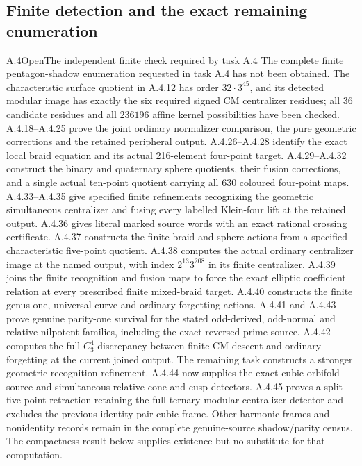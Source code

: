 \subsection{Finite detection and the exact remaining enumeration}

\begin{result}{A.4}{Open}{The independent finite check required by task A.4}
The complete finite pentagon-shadow enumeration requested in
task A.4 has not been obtained.  The characteristic surface
quotient in A.4.12 has order $32\cdot3^{45}$, and its detected
modular image has exactly the six required signed CM
centralizer residues; all $36$ candidate residues and all
$236196$ affine kernel possibilities have been checked.
A.4.18--A.4.25 prove the joint ordinary normalizer comparison,
the pure geometric corrections and the retained peripheral
output.  A.4.26--A.4.28 identify the exact local braid
equation and its actual 216-element four-point target.
A.4.29--A.4.32 construct the binary and quaternary sphere
quotients, their fusion corrections, and a single actual
ten-point quotient carrying all 630 coloured four-point
maps.  A.4.33--A.4.35 give specified finite refinements
recognizing the geometric simultaneous centralizer and
fusing every labelled Klein-four lift at the retained
output.  A.4.36 gives literal marked source words with
an exact rational crossing certificate.  A.4.37 constructs
the finite braid and sphere actions from a specified
characteristic five-point quotient.  A.4.38 computes the
actual ordinary centralizer image at the named output,
with index $2^{13}3^{208}$ in its finite centralizer.
A.4.39 joins the finite recognition and fusion maps to
force the exact elliptic coefficient relation at every
prescribed finite mixed-braid target.  A.4.40 constructs
the finite genus-one, universal-curve and ordinary
forgetting actions.  A.4.41 and A.4.43 prove genuine
parity-one survival for the stated odd-derived, odd-normal
and relative nilpotent families, including the exact
reversed-prime source.  A.4.42 computes the full $C_3^4$
discrepancy between finite CM descent and ordinary
forgetting at the current joined output.  The remaining
task constructs a stronger geometric recognition
refinement.  A.4.44 now supplies the exact cubic orbifold
source and simultaneous relative cone and cusp detectors.
A.4.45 proves a split five-point retraction retaining the
full ternary modular centralizer detector and excludes the
previous identity-pair cubic frame.  Other harmonic frames
and nonidentity records remain in the complete genuine-source
shadow/parity census.  The compactness result below
supplies existence but no substitute for that computation.
\end{result}

